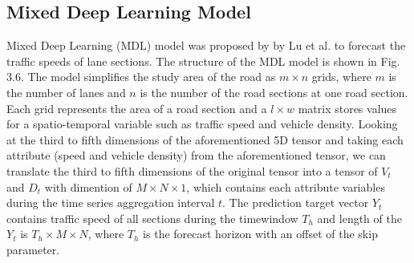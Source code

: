\documentclass[11pt]{uonthesis}
\begin{document}
\subsection{Mixed Deep Learning Model}

Mixed Deep Learning (MDL) model was proposed by by Lu et al.\cite{9284587} to forecast the traffic speeds of lane sections. The structure of the MDL model is shown in Fig. 3.6. The model simplifies the study area of the road as $m{\times}n$ grids, where $m$ is the number of lanes and $n$ is the number of the road sections at one road section. Each grid represents the area of a road section and a $l{\times}w$ matrix stores values for a spatio-temporal variable such as traffic speed and vehicle density. Looking at the third to fifth dimensions of the aforementioned 5D tensor and taking each attribute (speed and vehicle density) from the aforementioned tensor, we can translate the third to fifth dimensions of the original tensor into a tensor of ${V_t}$ and ${D_t}$ with dimention of $M{\times}N{\times}1$, which contains each attribute variables during the time series aggregation interval $t$. The prediction target vector $Y_t$ contains traffic speed of all sections during the timewindow $T_h$ and length of the $Y_t$ is $T_h{\times}M{\times}N$, where $T_h$ is the forecast horizon with an offset of the skip parameter. %
\end{document}
